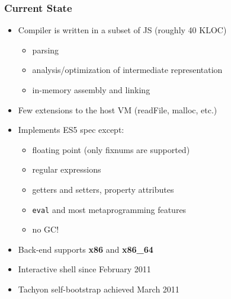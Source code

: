 \begin{frame}
\frametitle{\bf Current State}

  \begin{itemize}

  \item Compiler is written in a subset of JS (roughly 40 KLOC)
    \begin{itemize}
    \item parsing
    \item analysis/optimization of intermediate representation
    \item in-memory assembly and linking
    \end{itemize}
    \smallskip

  \item Few extensions to the host VM (readFile, malloc, etc.)
    \smallskip

  \item Implements ES5 spec except:
    \begin{itemize}
    \item floating point (only fixnums are supported)
    \item regular expressions
    \item getters and setters, property attributes
    \item {\tt eval} and most metaprogramming features
    \item no GC!
    \end{itemize}
    \smallskip

  \item Back-end supports {\bf x86} and {\bf x86\_64}
    \smallskip

  \item Interactive shell since February 2011
    \smallskip

  \item Tachyon self-bootstrap achieved March 2011
    \smallskip

  \end{itemize}
\end{frame}

